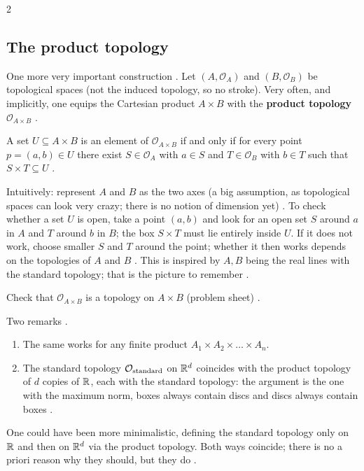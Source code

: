 \begin{paracol}{2}
\subsection{The product topology}

One more very important construction . Let $(A,\mathcal O_A)$ and $(B,\mathcal O_B)$ be topological
spaces (not the induced topology, so no stroke). Very often, and implicitly, one equips the Cartesian product $A\times B$ with
the \textbf{product topology} $\mathcal O_{A\times B}$ .

\begin{definition}\label{def:to-product}
A set $U\subseteq A\times B$ is an element of $\mathcal O_{A\times B}$ if and only if for every point $p=(a,b)\in U$
there exist $S\in\mathcal O_A$ with $a\in S$ and $T\in\mathcal O_B$ with $b\in T$ such that
$S\times T\subseteq U$ .
\end{definition}
Intuitively: represent $A$ and $B$ as the two axes (a big assumption, as topological spaces can look very crazy; there is no
notion of dimension yet) . To check whether a set $U$ is open, take a point $(a,b)$ and look for
an open set $S$ around $a$ in $A$ and $T$ around $b$ in $B$; the box $S\times T$ must lie entirely inside $U$. If it does not
work, choose smaller $S$ and $T$ around the point; whether it then works depends on the topologies of $A$ and $B$
. This is inspired by $A,B$ being the real lines with the standard topology; that is the
picture to remember .
\begin{exercise}\label{ex:to-product}
Check that $\mathcal O_{A\times B}$ is a topology on $A\times B$ (problem sheet) .
\end{exercise}
\begin{remark}\label{rem:to-product}
Two remarks .
\begin{enumerate}
  \item The same works for any finite product $A_1\times A_2\times\dots\times A_n$.
  \item The standard topology $\mathcal O_{\rm standard}$ on $\mathbb{R}^d$ coincides with the product topology of $d$ copies of
        $\mathbb{R}$, each with the standard topology: the argument is the one with the maximum norm, boxes always contain discs and
        discs always contain boxes .
\end{enumerate}
One could have been more minimalistic, defining the standard topology only on $\mathbb{R}$ and then on $\mathbb{R}^d$ via the product topology.
Both ways coincide; there is no a priori reason why they should, but they do .
\end{remark}


\end{paracol}
